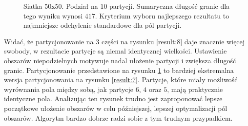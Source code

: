 \begin{figure}[h]
\begin{subfigure}{.33\textwidth}
    \caption[short]{}
\end{subfigure}
\caption{Siatka $50$x$50$. Podział na $10$ partycji. Sumaryczna długość granic dla tego wyniku wynosi $417$.
Kryterium wyboru najlepszego rezultatu to najmniejsze odchylenie standardowe dla pól partycji.}
\label{result:9}
\end{figure}

Widać, że partycjonowanie na $3$ części na rysunku \ref{result:8} daje znacznie więcej swobody, w rezultacie
partycje są niemal identycznej wielkości.
Ustawienie obszarów niepodzielnych motywuje nadal ułożenie partycji i zwiększa długość granic.
Partycjonowanie przedstawione na rysunku \ref{result:9} to bardziej ekstremalna wersja partycjonowania na rysunku \ref{result:7}.
Partycje, które miały możliwość wyrównania pola między sobą, jak partycje $6$, $4$ oraz $5$,
mają praktycznie identyczne pola.
Analizując ten rysunek trudno jest zaproponować lepsze początkowe ułożenie obszarów w celu późniejszej, lepszej optymalizacji
pól obszarów.
Algorytm bardzo dobrze radzi sobie z tym trudnym przypadkiem.

\vspace{4mm}


